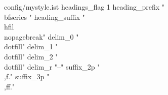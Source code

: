 \begingroup\newif\ifmy
{}
\ifmy
\begin{filecontents}[overwrite]{config/mystyle.ist}
	headings_flag  1 %
	heading_prefix "{\\bfseries " %
	heading_suffix "\\hfil}\\nopagebreak\n"%
	delim_0 "\\dotfill" %
	delim_1 "\\dotfill" %
	delim_2 "\\dotfill" %
	delim_r "--" %
	suffix_2p "\\,f." %
	suffix_3p "\\,ff." %
\end{filecontents}
\fi\endgroup